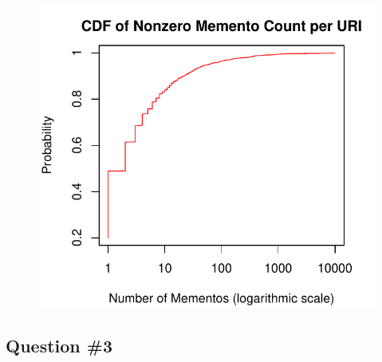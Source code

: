 \documentclass[a4paper,12pt]{article}
\begin{document}
\begin{figure}[H]
    \centering
    \includegraphics{stats/memento_counts_nonzero.pdf}
\end{figure}

\subsection{Question \#3}
\end{document}
